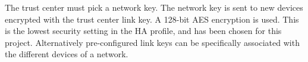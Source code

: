 \documentclass[Main]{subfiles}
\begin{document}
				The trust center must pick a network key. The network key is sent to new devices encrypted with the trust center link key.
				A 128-bit AES encryption is used.
				This is the lowest security setting in the HA profile, and has been chosen for this project. 
				Alternatively pre-configured link keys can be specifically associated with the different devices of a network.
			\label{par:security}
			

			





\end{document}
